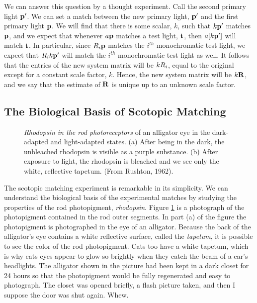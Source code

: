 We can answer this question by a thought experiment.
Call the second primary light $\mbox{$\bf p$} '$.
We can set a match 
between the new primary light,
${\mbox{$\bf p$} '}$ and the first primary light $\mbox{$\bf p$}$.
We will find that there is some scalar,
$k$, such that $k {\mbox{$\bf p$} '}$ matches $\mbox{$\bf p$}$,
and we expect that
whenever $a \mbox{$\bf p$}$ matches a test light, $\mbox{${\bf t}$}$, 
then $ a [ k \mbox{$\bf p$} ']$  will match $\mbox{${\bf t}$}$.
In particular, since $R_{i} \mbox{$\bf p$}$ matches
the $i^{th}$ monochromatic test light,
we expect that $R_{i} k  { \mbox{$\bf p$} '}$ will
match the $i^{th}$ monochromatic test light as well.
It follows that the entries of the new system matrix
will be $k R_{i}$,
equal to the original except for a constant scale factor, $k$.
Hence, the new system matrix will be
$k \mbox{$\bf R$}$, and
we say that the estimate of $\mbox{$\bf R$}$ is unique
up to an unknown scale factor.

\subsection*{The Biological Basis of Scotopic Matching}

\begin{figure}
\centerline {
}
\caption[Rhodopsin in the Alligator]{
{\em Rhodopsin in the rod photoreceptors} of an alligator eye
in the dark-adapted and light-adapted states.
(a) After being in the dark,
the unbleached rhodopsin is visible as a purple substance.
(b) After exposure to light, the rhodopsin is bleached
and we see only the white, reflective tapetum.
(From Rushton, 1962).
}
\label{f3:alligator}
\end{figure}
The scotopic matching experiment is remarkable in its simplicity.
We can understand the biological basis of the
experimental matches by studying
the properties of the rod photopigment, {\em rhodopsin}.
Figure \ref{f3:alligator}
is a photograph of
the photopigment contained in the rod outer segments.
In part (a) of the figure
the photopigment is photographed
in the eye of an alligator.
Because the back of the alligator's eye contains a white 
reflective surface, called the {\em tapetum}, it is possible
to see the color of the rod photopigment.
Cats too have a white tapetum,
which is why cats eyes appear to glow so brightly when they
catch the beam of a car's headlights.
The alligator shown in the
picture had been kept in a dark closet for 24 hours so
that the photopigment would be fully regenerated and
easy to photograph.
The closet was opened briefly, a flash picture taken,
and then I suppose the door was shut again. Whew.
\nocite{RushtonAlligatorSciAm}

